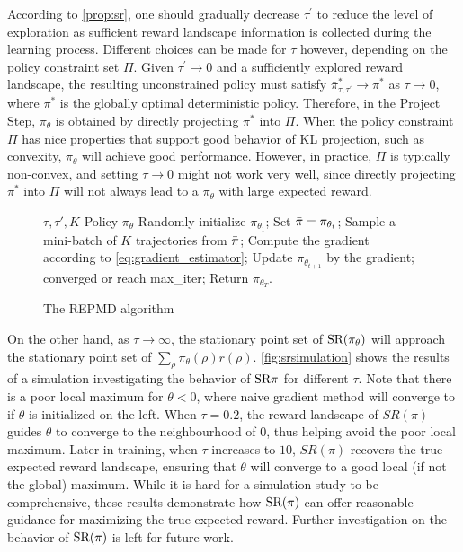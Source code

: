 According to \cref{prop:sr}, one should gradually decrease $\tau^{\prime}$
to reduce the level of exploration as sufficient reward landscape information
is collected during the learning process.
Different choices can be made for $\tau$ however,
depending on the policy constraint set $\Pi$.
Given $\tau^{\prime} \to 0$ and a sufficiently explored reward landscape,
the resulting unconstrained policy must satisfy
$\bar{\pi}_{\tau,\tau^{\prime}}^* \to \pi^*$ as $\tau \to 0$,
where $\pi^*$ is the globally optimal deterministic policy. 
Therefore, in the Project Step, $\pi_\theta$ is obtained by directly
projecting $\pi^*$ into $\Pi$.
When the policy constraint $\Pi$ has nice properties
that support good behavior of KL projection,
such as convexity,
$\pi_\theta$ will achieve good performance.
However, in practice, $\Pi$ is typically non-convex,
and setting $\tau \to 0$ might not work very well,
since directly projecting $\pi^*$ into $\Pi$ will not always lead to
a $\pi_\theta$ with large expected reward.
%
\begin{figure}
	\begin{minipage}{0.56\textwidth}
		\begin{algorithm}[H]
			\caption{\label{alg:repmd}  The REPMD algorithm}
			\begin{algorithmic}[1]
				\INPUT $\tau, \tau', K$
				\OUTPUT  Policy $\pi_\theta$
				\STATE Randomly initialize $\pi_{\theta_1}$;
				\STATE Set $\bar{\pi} = \pi_{\theta_t}$;
				\REPEAT 
				\STATE Sample a mini-batch of $K$ trajectories from $\bar{\pi}$;
				\STATE Compute the gradient according to \cref{eq:gradient_estimator};
				\STATE Update $\pi_{\theta_{t+1}}$ by the gradient;
				\UNTIL converged or reach max\_iter;
				\ENDFOR
				\STATE Return $\pi_{\theta_T}$.
			\end{algorithmic}
		\end{algorithm}
	\end{minipage}
\end{figure}


On the other hand, as $\tau \to \infty$,
the stationary point set of $\text{SR}(\pi_\theta)$ will approach the
stationary point set of $\sum_{\rho}{ \pi_\theta(\rho) r(\rho) }$.
\cref{fig:srsimulation} shows the results of a simulation
investigating the behavior of $\text{SR}{\pi}$ for different $\tau$.
Note that there is a poor local maximum for $\theta <0$,
where naive gradient method will converge to if $\theta$ is initialized
on the left. 
When $\tau = 0.2$, the reward landscape of $SR(\pi)$ guides
$\theta$ to converge to the neighbourhood of $0$,
thus helping avoid the poor local maximum.
Later in training, when $\tau$ increases to $10$,
$SR(\pi)$ recovers the true expected reward landscape,
ensuring that $\theta$ will converge to a good local (if not the global)
maximum.
While it is hard for a simulation study to be comprehensive,
these results demonstrate how $\text{SR}(\pi)$ can offer reasonable guidance
for maximizing the true expected reward.
Further investigation on the behavior of $\text{SR}(\pi)$
is left for future work.
 
